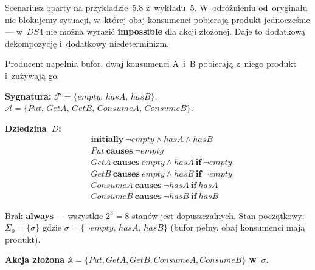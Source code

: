 \documentclass[11pt,a4paper]{article}
\newcommand{\causes}{\textbf{causes}}
\renewcommand{\iff}{\textbf{if}}
\newcommand{\initially}{\textbf{initially}}
\newcommand{\always}{\textbf{always}}
\newcommand{\impossible}{\textbf{impossible}}
\begin{document}
\noindent Scenariusz oparty na przykładzie~5.8 z~wykładu~5.
W~odróżnieniu od~oryginału nie blokujemy sytuacji, w~której obaj
konsumenci pobierają produkt jednocześnie --- w~$\mathit{DS4}$
nie można wyrazić \impossible{} dla akcji złożonej.
Daje to dodatkową dekompozycję i~dodatkowy niedeterminizm.

Producent napełnia bufor, dwaj konsumenci A~i~B pobierają z~niego
produkt i~zużywają go.

\medskip
\noindent\textbf{Sygnatura:}
$\mathcal{F} = \{\mathit{empty},\, \mathit{hasA},\, \mathit{hasB}\}$, \quad
$\mathcal{A} = \{\mathit{Put},\, \mathit{GetA},\, \mathit{GetB},\,
  \mathit{ConsumeA},\, \mathit{ConsumeB}\}$.

\medskip
\noindent\textbf{Dziedzina~$D$:}
\begin{align*}
  &\initially\ \neg\mathit{empty} \land \mathit{hasA} \land \mathit{hasB} \\
  &\mathit{Put}\ \causes\ \neg\mathit{empty} \\
  &\mathit{GetA}\ \causes\ \mathit{empty} \land \mathit{hasA}\ \iff\ \neg\mathit{empty} \\
  &\mathit{GetB}\ \causes\ \mathit{empty} \land \mathit{hasB}\ \iff\ \neg\mathit{empty} \\
  &\mathit{ConsumeA}\ \causes\ \neg\mathit{hasA}\ \iff\ \mathit{hasA} \\
  &\mathit{ConsumeB}\ \causes\ \neg\mathit{hasB}\ \iff\ \mathit{hasB}
\end{align*}

Brak \always{} --- wszystkie $2^3 = 8$ stanów jest dopuszczalnych.
Stan początkowy: $\Sigma_0 = \{\sigma\}$ gdzie
$\sigma = \{\neg\mathit{empty},\, \mathit{hasA},\, \mathit{hasB}\}$
(bufor pełny, obaj konsumenci mają produkt).

\medskip
\noindent\textbf{Akcja złożona $\mathbb{A} = \{\mathit{Put}, \mathit{GetA}, \mathit{GetB},
\mathit{ConsumeA}, \mathit{ConsumeB}\}$ w~$\sigma$.}
\end{document}
